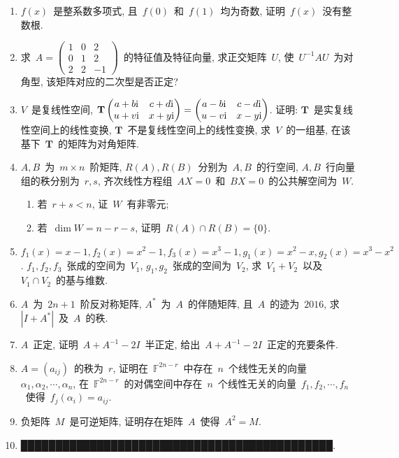 \documentclass[UTF8,a4paper,11pt]{article}
\begin{document}
\begin{enumerate}
	\item $f(x)$~是整系数多项式, 且~$f(0)$~和~$f(1)$~均为奇数, 证明~$f(x)$~没有整数根.
	      \vspace{2em}
	\item 求~$A=\begin{pmatrix} 1 & 0 & 2\\ 0 & 1 &2\\ 2 & 2 & -1\end{pmatrix}$~的特征值及特征向量, 求正交矩阵~$U$, 使~$U^{-1}AU$~为对角型, 该矩阵对应的二次型是否正定?
	      \vspace{2em}
	\item $V$~是复线性空间, $\mathbf{T}\begin{pmatrix}a+b\mathrm{i} & c+d\mathrm{i}\\ u+v\mathrm{i} & x+y\mathrm{i}\end{pmatrix}=\begin{pmatrix}a-b\mathrm{i} & c-d\mathrm{i}\\ u-v\mathrm{i} & x-y\mathrm{i}\end{pmatrix}$. 证明: $\mathbf{T}$~是实复线性空间上的线性变换, $\mathbf{T}$~不是复线性空间上的线性变换, 求~$V$~的一组基, 在该基下~$\mathbf{T}$~的矩阵为对角矩阵.
	      \vspace{2em}
	\item $A,B$~为~$m\times n$~阶矩阵, $R(A), R(B)$~分别为~$A,B$~的行空间, $A,B$~行向量组的秩分别为~$r,s$, 齐次线性方程组~$AX=0$~和~$BX=0$~的公共解空间为~$W$.
	      \begin{enumerate}
		      \item 若~$r+s<n$, 证~$W$~有非零元;
		      \item 若~$\dim W=n-r-s$, 证明~$R(A)\cap R(B)=\{0\}$.
	      \end{enumerate}
	      \vspace{2em}
	\item $f_1(x)=x-1, f_2(x)=x^2-1, f_3(x)=x^3-1, g_1(x)=x^2-x, g_2(x)=x^3-x^2$. $f_1,f_2,f_3$~张成的空间为~$V_1$, $g_1,g_2$~张成的空间为~$V_2$, 求~$V_1+V_2$~以及~$V_1\cap V_2$~的基与维数.
	      \vspace{2em}
	\item $A$~为~$2n+1$~阶反对称矩阵, $A^{*}$~为~$A$~的伴随矩阵, 且~$A$~的迹为~$2016$, 求~$|I+A^{*}|$~及~$A$~的秩.
	      \vspace{2em}
	\item $A$~正定, 证明~$A+A^{-1}-2I$~半正定, 给出~$A+A^{-1}-2I$~正定的充要条件.
	      \vspace{2em}
	\item $A=(a_{ij})$~的秩为~$r$, 证明在~$\mathbb{F}^{2n-r}$~中存在~$n$~个线性无关的向量~$\alpha_1,\alpha_2,\cdots,\alpha_n$, 在~$\mathbb{F}^{2n-r}$~的对偶空间中存在~$n$~个线性无关的向量~$f_1,f_2,\cdots,f_n$~使得~$f_j(\alpha_i)=a_{ij}$.
	      \vspace{2em}
	\item 负矩阵~$M$~是可逆矩阵, 证明存在矩阵~$A$~使得~$A^2=M$.
	      \vspace{2em}
	\item █████████████████████████████████████████████.
	      \vspace{2em}
\end{enumerate}
\end{document}
